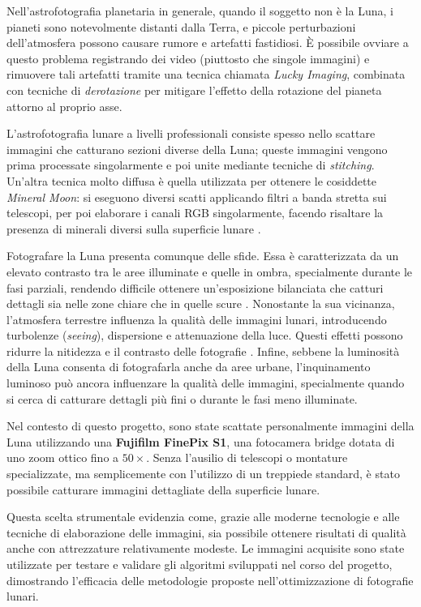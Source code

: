 Nell'astrofotografia planetaria in generale, quando il soggetto non è la Luna, i pianeti sono notevolmente distanti dalla Terra, e piccole perturbazioni dell'atmosfera possono causare rumore e artefatti fastidiosi. È possibile ovviare a questo problema registrando dei video (piuttosto che singole immagini) e rimuovere tali artefatti tramite una tecnica chiamata \textit{Lucky Imaging}, combinata con tecniche di \textit{derotazione} per mitigare l'effetto della rotazione del pianeta attorno al proprio asse.

L'astrofotografia lunare a livelli professionali consiste spesso nello scattare immagini che catturano sezioni diverse della Luna; queste immagini vengono prima processate singolarmente e poi unite mediante tecniche di \textit{stitching}. Un'altra tecnica molto diffusa è quella utilizzata per ottenere le cosiddette \textit{Mineral Moon}: si eseguono diversi scatti applicando filtri a banda stretta sui telescopi, per poi elaborare i canali RGB singolarmente, facendo risaltare la presenza di minerali diversi sulla superficie lunare \cite{legault_astrophoto}.

Fotografare la Luna presenta comunque delle sfide. Essa è caratterizzata da un elevato contrasto tra le aree illuminate e quelle in ombra, specialmente durante le fasi parziali, rendendo difficile ottenere un'esposizione bilanciata che catturi dettagli sia nelle zone chiare che in quelle scure \cite{sheehan_epic_moon}. Nonostante la sua vicinanza, l'atmosfera terrestre influenza la qualità delle immagini lunari, introducendo turbolenze (\textit{seeing}), dispersione e attenuazione della luce. Questi effetti possono ridurre la nitidezza e il contrasto delle fotografie \cite{sheehan_epic_moon}. Infine, sebbene la luminosità della Luna consenta di fotografarla anche da aree urbane, l'inquinamento luminoso può ancora influenzare la qualità delle immagini, specialmente quando si cerca di catturare dettagli più fini o durante le fasi meno illuminate.

Nel contesto di questo progetto, sono state scattate personalmente immagini della Luna utilizzando una \textbf{Fujifilm FinePix S1}, una fotocamera bridge dotata di uno zoom ottico fino a $50 \times$. Senza l'ausilio di telescopi o montature specializzate, ma semplicemente con l'utilizzo di un treppiede standard, è stato possibile catturare immagini dettagliate della superficie lunare.

Questa scelta strumentale evidenzia come, grazie alle moderne tecnologie e alle tecniche di elaborazione delle immagini, sia possibile ottenere risultati di qualità anche con attrezzature relativamente modeste. Le immagini acquisite sono state utilizzate per testare e validare gli algoritmi sviluppati nel corso del progetto, dimostrando l'efficacia delle metodologie proposte nell'ottimizzazione di fotografie lunari.
\cleardoublepage